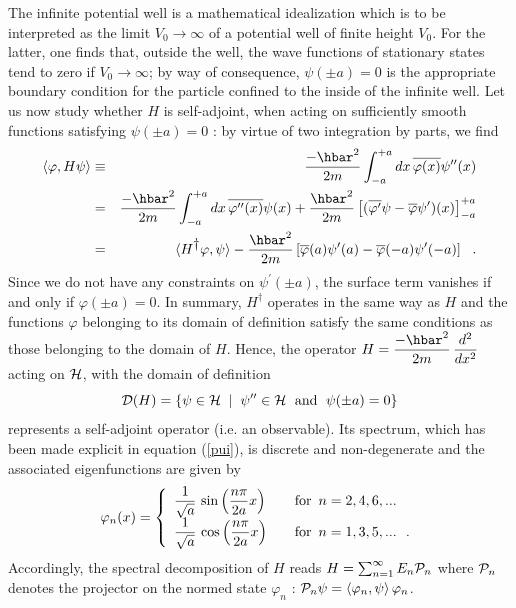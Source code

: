\documentclass[12pt]{report}
\begin{document}
The infinite potential well is a mathematical idealization 
which is to be interpreted as the limit $V_0 \rightarrow \infty$
of a potential well of finite height $V_0$. For the latter, 
one finds that, outside the well, the wave functions 
of stationary states tend to zero if 
$V_0 \rightarrow \infty$; by way of consequence, $\psi(\pm a)=0$
is the appropriate boundary condition for the particle 
confined to the inside of 
the infinite well. Let us now study whether $H$ is self-adjoint,
when acting on sufficiently smooth  functions 
satisfying $\psi (\pm a)=0$ : by virtue of two integration 
by parts, we find  
\begin{eqnarray*}
\langle \varphi , H \psi \rangle & \equiv &
\ds{- \hbar^2 \over 2m} \int_{-a}^{+a} dx \, \overline{\varphi(x)}
\psi^{\prime \prime}(x)
\\
&= &
\ds{- \hbar^2 \over 2m} \int_{-a}^{+a} dx \, \overline{\varphi^{\prime
\prime}(x)}
\psi (x) +
\ds{\hbar^2 \over 2m}
\left[ (\overline{\varphi^{\prime}} \psi - \overline{\varphi}
\psi^{\prime} )(x) \right]_{-a}^{+a}
\\
& = & \langle H^{\dag} \varphi , \psi \rangle -
\ds{\hbar^2 \over 2m}
\left[ \overline{\varphi} (a)\psi^{\prime} (a) - \overline{\varphi}(-a)
\psi^{\prime} (-a) \right]
\ \ .
\end{eqnarray*}
Since we do not have any constraints on $\psi^{\prime}(\pm a)$,
the surface term vanishes if and only if $\varphi (\pm a)=0$.
In summary, $H^{\dag}$ operates in the same way as $H$
and the functions $\varphi$ belonging to its domain of definition 
satisfy the same conditions as those belonging to the domain of $H$. 
Hence, the operator 
$H= \ds{-\hbar^2 \over 2m} \, \ds{d^2 \over dx^2}$ acting on 
${\cal H}$, with the domain of definition 
\begin{equation}
{\cal D} (H) = \{ \psi \in {\cal H} \; \mid \; \psi^{\prime \prime}
\in {\cal H} \ \; {\rm and} \ \; \psi(\pm a) =0 \}
\end{equation}
represents a self-adjoint operator (i.e. an observable). 
Its spectrum, which has been made explicit in equation (\ref{pui}),
is discrete and non-degenerate and the associated eigenfunctions 
are given by 
\[
\varphi_n (x) = \left\{
\begin{array}{ll}
\displaystyle{1 \over \sqrt a} \  {\rm sin}  \left( \displaystyle{n\pi \over 2a} x \right)
& \quad {\rm for} \ \, n=2,4,6,...
\\
\displaystyle{1 \over \sqrt a} \  {\rm cos}  \left( \displaystyle{n\pi \over 2a} x \right)
& \quad {\rm for} \ \, n=1,3,5,... \ \ .
\end{array}
\right.
\]
Accordingly, the spectral decomposition of $H$ reads
$H= \sum_{n=1}^{\infty} E_n {\cal P}_n$ where ${\cal P}_n$
 denotes the projector on the normed state $\varphi_n$ :
${\cal P}_n \psi = \langle \varphi_n , \psi \rangle \, \varphi_n$.
 
\end{document}
